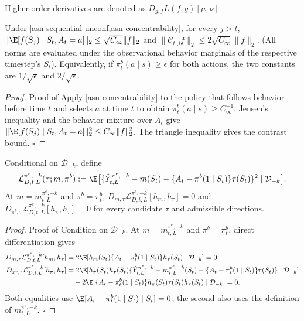 \documentclass[opre,nonblindrev]{informs4}
\providecommand{\cD}{\mathcal D}
\providecommand{\cC}{\mathcal C}
\newcommand{\norm}[1]{\lVert#1\rVert}
\newcommand{\blipadv}{\tau}
\renewcommand{\qed}{\unskip\nobreak\hfill\ensuremath{\square}}
\begin{document}
Higher order derivatives are denoted as $D_{g, f} L(f, g)[\mu, \nu]$.
\begin{lemma}
\label{lem:diff-overlap-action-contrast}
Under \cref{asn-sequential-unconf,asn-concentrability}, for every $j>t$,
$\norm{\E[f(S_j)\mid S_t,A_t=a]}_2
\leq\sqrt{C_\infty}\norm f_2$ and
$\norm{\cC_{t,j}f}_2\leq2\sqrt{C_\infty}\norm f_2$.
(All norms are evaluated under the observational behavior marginals of the respective timestep's $S_t$).
Equivalently, if $\pi_t^b(a\mid s)\geq\epsilon$ for both actions, the two
constants are $1/\sqrt\epsilon$ and $2/\sqrt\epsilon$.
\end{lemma}

\begin{proof}{Proof of }
Apply \cref{asn-concentrability} to the policy that follows behavior before
time $t$ and selects $a$ at time $t$ to obtain
$\pi_t^b(a\mid s)\geq C_\infty^{-1}$. Jensen's inequality and the behavior
mixture over $A_t$ give
$\norm{\E[f(S_j)\mid S_t,A_t=a]}_2^2
\leq C_\infty\norm f_2^2$. The triangle inequality gives the contrast bound. \qed
\end{proof}

\begin{lemma}
\label{lemma-universal-ortho}
\label{lem:diff-contemporaneous-orthogonality}
Conditional on $\cD_{-k}$, define
\[
\mathcal L_{D,t,L}^{\pi^e,-k}(\blipadv;m,\pi^b)
:=\E\big[\{\hat Y_{t,L}^{\pi^e,-k}-m(S_t)
-\{A_t-\pi^b(1\mid S_t)\}\blipadv(S_t)\}^2\mid\cD_{-k}\big].
\]
At $m=m_{t,L}^{\pi^e,-k}$ and $\pi^b=\pi_t^b$,
$D_{m,\blipadv}\mathcal L_{D,t,L}^{\pi^e,-k}[h_m,h_{\blipadv}]=0$ and
$D_{\pi^b,\blipadv}\mathcal L_{D,t,L}^{\pi^e,-k}[h_{\pi},h_{\blipadv}]=0$
for every candidate $\blipadv$ and admissible directions. 
\end{lemma}
\begin{proof}{Proof of }
Condition on $\cD_{-k}$. At
$m=m_{t,L}^{\pi^e,-k}$ and $\pi^b=\pi_t^b$, direct differentiation
gives
\begin{align*}
D_{m,\blipadv}\mathcal L_{D,t,L}^{\pi^e,-k}[h_m,h_{\blipadv}]
&=
2\E[ h_m(S_t)\{A_t-\pi_t^b(1\mid S_t)\}
h_{\blipadv}(S_t)\mid\cD_{-k}]
=0,\\
D_{\pi^b,\blipadv}\mathcal L_{D,t,L}^{\pi^e,-k}[h_{\pi},h_{\blipadv}]
&=
2\E[ h_{\pi}(S_t)h_{\blipadv}(S_t)
\{\hat Y_{t,L}^{\pi^e,-k}-m_{t,L}^{\pi^e,-k}(S_t)
-\{A_t-\pi_t^b(1\mid S_t)\}\blipadv(S_t)\}
\mid\cD_{-k}]\\
&\quad-
2\E[\{A_t-\pi_t^b(1\mid S_t)\}
h_{\pi}(S_t)\blipadv(S_t)h_{\blipadv}(S_t)
\mid\cD_{-k}]
=0.
\end{align*}
Both equalities use
$\E[A_t-\pi_t^b(1\mid S_t)\mid S_t]=0$; the second also uses the
definition of $m_{t,L}^{\pi^e,-k}$. \qed
\end{proof}
\end{document}
